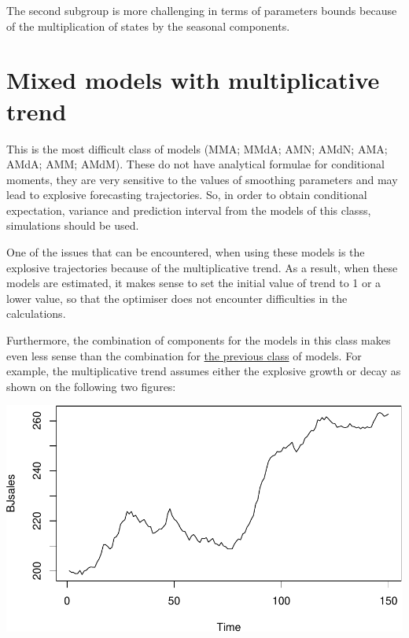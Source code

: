 \documentclass[
]{book}
\theoremstyle{definition}
\theoremstyle{definition}
\theoremstyle{definition}
\theoremstyle{definition}
\theoremstyle{remark}
\begin{document}
The second subgroup is more challenging in terms of parameters bounds because of the multiplication of states by the seasonal components.

\hypertarget{ADAMETSMixedModelsGroup4}{%
\section{Mixed models with multiplicative trend}\label{ADAMETSMixedModelsGroup4}}

This is the most difficult class of models (MMA; MMdA; AMN; AMdN; AMA; AMdA; AMM; AMdM). These do not have analytical formulae for conditional moments, they are very sensitive to the values of smoothing parameters and may lead to explosive forecasting trajectories. So, in order to obtain conditional expectation, variance and prediction interval from the models of this classs, simulations should be used.

One of the issues that can be encountered, when using these models is the explosive trajectories because of the multiplicative trend. As a result, when these models are estimated, it makes sense to set the initial value of trend to 1 or a lower value, so that the optimiser does not encounter difficulties in the calculations.

Furthermore, the combination of components for the models in this class makes even less sense than the combination for \protect\hyperlink{ADAMETSMixedModelsGroup3}{the previous class} of models. For example, the multiplicative trend assumes either the explosive growth or decay as shown on the following two figures:

\includegraphics{adam_files/figure-latex/unnamed-chunk-51-1.pdf}
\end{document}
